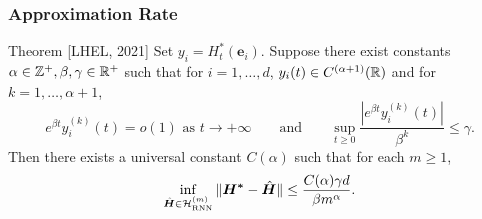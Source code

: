 \begin{frame}
    \frametitle{Approximation Rate}

    \begin{alertblock}{Theorem [LHEL, 2021]}
        Set $y_i = H^*_t(\bm e_i)$.
        Suppose there exist constants $\alpha\in \mathbb{Z}^+, \beta,\gamma\in \mathbb{R}^+$
        such that for $i=1,\dots,d$, $y_i(t) \in C^{(\alpha+1)}(\mathbb{R})$ and for $k=1,\dots,\alpha+1$,
        \begin{equation*}
            e^{\beta t}y_i^{(k)}(t) = o(1) \text{ as } t \rightarrow +\infty
            \qquad
            \text{and}
            \qquad
            \sup_{t \geq 0} \frac{ |e^{\beta t}y_i^{(k)}(t)|}{\beta^k} \leq \gamma.
        \end{equation*}
        Then there exists a universal constant $C(\alpha)$ such that for each $m \geq 1$,
        \begin{equation*}
            \inf_{\hat{\bm H} \in \mathcal H_{\text{RNN}}^{(m)}}
            \| \bm {H^*} - \hat{\bm H} \|
            \leq \frac{C(\alpha)\gamma d}{ \beta m^\alpha}.
        \end{equation*}
    \end{alertblock}

\end{frame}

